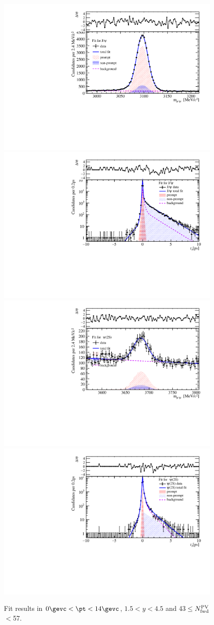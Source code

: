 \begin{figure}[H]
\begin{center}
\includegraphics[width=0.45\linewidth]{pdf/pPb/FWorkdir/TwoDimFit/ProjMass/Jpsi_n3y1pt1.pdf}
\includegraphics[width=0.45\linewidth]{pdf/pPb/FWorkdir/TwoDimFit/ProjTz/Jpsi_n3y1pt1.pdf}
\vspace*{-0.5cm}
\includegraphics[width=0.45\linewidth]{pdf/pPb/FWorkdir/TwoDimFit/ProjMass/Psi2S_n3y1pt1.pdf}
\includegraphics[width=0.45\linewidth]{pdf/pPb/FWorkdir/TwoDimFit/ProjTz/Psi2S_n3y1pt1.pdf}
\vspace*{-0.5cm}
\end{center}
\caption{Fit results in $0\gevc<\pt<14\gevc$, $1.5<y<4.5$ and 43$\leq$$N^{\rm PV}_{\rm fwd}$$<$57.}
\end{figure}

